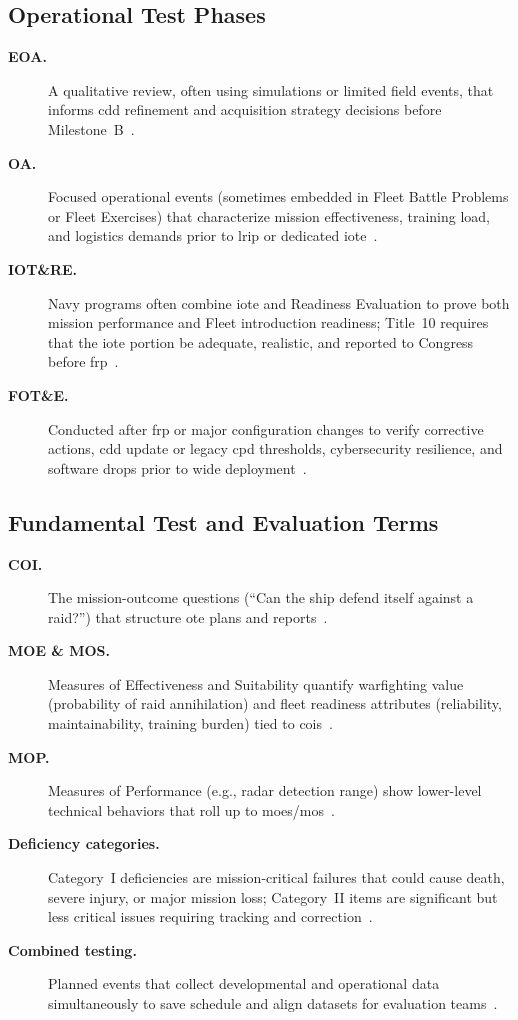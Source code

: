 \documentclass[../main.tex]{subfiles}
\begin{document}
\subsection{Operational Test Phases}
\begin{description}
  \item[\textbf{EOA.}] A qualitative review, often using simulations or limited field events, that informs \ac{cdd} refinement and acquisition strategy decisions before Milestone~B~\autocite{edo-3-5-6-test-eval-part-ii-2025}.
  \item[\textbf{OA.}] Focused operational events (sometimes embedded in Fleet Battle Problems or Fleet Exercises) that characterize mission effectiveness, training load, and logistics demands prior to \ac{lrip} or dedicated \ac{iote}~\autocite{edo-3-5-6-test-eval-part-ii-2025}.
  \item[\textbf{IOT\&RE.}] Navy programs often combine \ac{iote} and Readiness Evaluation to prove both mission performance and Fleet introduction readiness; Title~10 requires that the \ac{iote} portion be adequate, realistic, and reported to Congress before \ac{frp}~\autocite{USC-10-4171}.
  \item[\textbf{FOT\&E.}] Conducted after \ac{frp} or major configuration changes to verify corrective actions, \ac{cdd} update or legacy \ac{cpd} thresholds, cybersecurity resilience, and software drops prior to wide deployment~\autocite{DoDI5000-89}.
\end{description}

\subsection{Fundamental Test and Evaluation Terms}
\begin{description}
  \item[\textbf{COI.}] The mission-outcome questions (``Can the ship defend itself against a raid?'') that structure \ac{ote} plans and reports~\autocite{edo-3-5-6-test-eval-part-ii-2025}.
  \item[\textbf{MOE \& MOS.}] Measures of Effectiveness and Suitability quantify warfighting value (probability of raid annihilation) and fleet readiness attributes (reliability, maintainability, training burden) tied to \acp{coi}~\autocite{edo-3-5-6-test-eval-part-ii-2025}.
  \item[\textbf{MOP.}] Measures of Performance (e.g., radar detection range) show lower-level technical behaviors that roll up to \acp{moe}/\ac{mos}~\autocite{edo-3-5-5-test-eval-part-i-2025}.
  \item[\textbf{Deficiency categories.}] Category~I deficiencies are mission-critical failures that could cause death, severe injury, or major mission loss; Category~II items are significant but less critical issues requiring tracking and correction~\autocite{edo-3-5-6-test-eval-part-ii-2025}.
  \item[\textbf{Combined testing.}] Planned events that collect developmental and operational data simultaneously to save schedule and align datasets for evaluation teams~\autocite{DoDI5000-02}.
\end{description}
\end{document}
